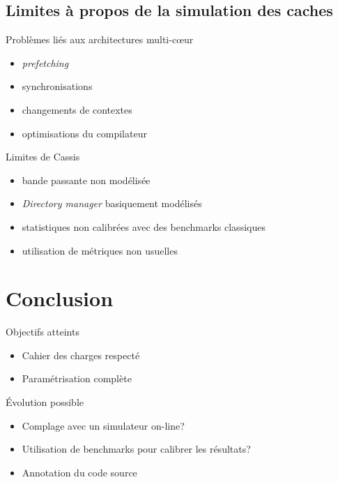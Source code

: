 \subsection{Limites \`a  propos de la simulation des caches}
\begin{frame}
  \begin{block}{Probl\`emes li\'es aux architectures multi-c{\oe}ur}
    \begin{itemize}
      \item \emph{prefetching}
      \item synchronisations
      \item changements de contextes 
      \item optimisations du compilateur
    \end{itemize}
  \end{block}
  \begin{block}{Limites de Cassis}
    \begin{itemize}
      \item bande passante non mod\'elis\'ee
      \item \emph{Directory manager} basiquement mod\'elis\'es
      \item statistiques non calibr\'ees avec des benchmarks classiques
      \item utilisation de m\'etriques non usuelles
    \end{itemize}
  \end{block}
\end{frame}


\section*{Conclusion}
\begin{frame}
  \begin{block}{Objectifs atteints}
    \begin{itemize}
      \item Cahier des charges respect\'e
      \item Param\'etrisation compl\`ete
    \end{itemize}
  \end{block}

  \begin{block}{\'Evolution possible}
    \begin{itemize}
      \item Complage avec un simulateur \textsf{on-line}?
      \item Utilisation de benchmarks pour calibrer les r\'esultats?
      \item Annotation du code source
    \end{itemize}
  \end{block}
\end{frame}
